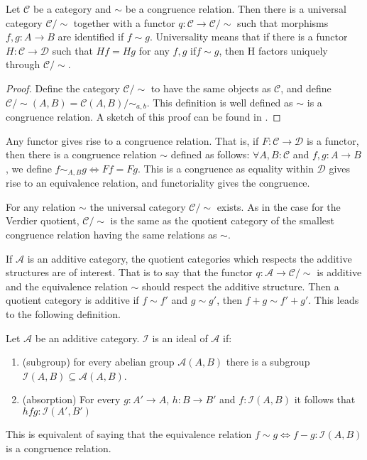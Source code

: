     \begin{prop}
        Let $\mathcal{C}$ be a category and $\sim$ be a congruence relation. Then there is a universal category $\mathcal{C}/\sim$ together with a functor $q:\mathcal{C}\rightarrow \mathcal{C}/\sim$ such that morphisms $f,g:A\rightarrow B$ are identified if $f\sim g$. Universality means that if there is a functor $H:\mathcal{C}\rightarrow \mathcal{D}$ such that $Hf=Hg$ for any $f,g$ if$f\sim g$, then H factors uniquely through $\mathcal{C}/\sim$.
    \end{prop}

    \begin{proof}
        Define the category $\mathcal{C}/\sim$ to have the same objects as $\mathcal{C}$, and define $\mathcal{C}/\sim (A,B)=\mathcal{C}(A,B)/\sim_{a,b}$. This definition is well defined as $\sim$ is a congruence relation. A sketch of this proof can be found in \cite{Mac71}.
    \end{proof}

    \begin{remark}
        Any functor gives rise to a congruence relation. That is, if $F:\mathcal{C}\rightarrow \mathcal{D}$ is a functor, then there is a congruence relation $\sim$ defined as follows: $\forall A,B:\mathcal{C}$ and $f,g:A\rightarrow B$, we define $f\sim_{A,B}g \iff Ff=Fg$. This is a congruence as equality within $\mathcal{D}$ gives rise to an equivalence relation, and functoriality gives the congruence.
    \end{remark}

    \begin{remark}
        For any relation $\sim$ the universal category $\mathcal{C}/\sim$ exists. As in the case for the Verdier quotient, $\mathcal{C}/\sim$ is the same as the quotient category of the smallest congruence relation having the same relations as $\sim$.
    \end{remark}

    If $\mathcal{A}$ is an additive category, the quotient categories which respects the additive structures are of interest. That is to say that the functor $q:\mathcal{A}\rightarrow \mathcal{C}/\sim$ is additive and the equivalence relation $\sim$ should respect the additive structure. Then a quotient category is additive if $f\sim f'$ and $g\sim g'$, then $f+g\sim f'+g'$. This leads to the following definition. 

    \begin{definition}
        Let $\mathcal{A}$ be an additive category. $\mathcal{I}$ is an ideal of $\mathcal{A}$ if:
        \begin{enumerate}
            \item (subgroup) for every abelian group $\mathcal{A}(A,B)$ there is a subgroup $\mathcal{I}(A,B)\subseteq\mathcal{A}(A,B)$.
            \item (absorption) For every $g:A'\rightarrow A$, $h:B\rightarrow B'$ and $f:\mathcal{I}(A,B)$ it follows that $hfg:\mathcal{I}(A',B')$
        \end{enumerate}
        This is equivalent of saying that the equivalence relation $f\sim g \iff f-g:\mathcal{I}(A,B)$ is a congruence relation.
    \end{definition}

